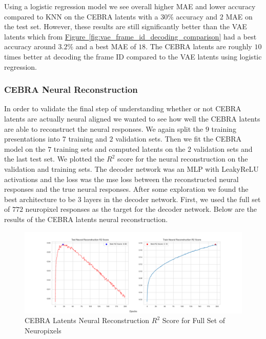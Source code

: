 \documentclass[12pt, letterpaper]{article}
\begin{document}
Using a logistic regression model we see overall higher MAE and lower accuracy compared to KNN on the CEBRA \cite{schneider2023} latents with a $30\%$ accuracy and $2$ MAE on the test set. However, these results are still significantly better than the VAE latents which from \hyperref[fig:vae_frame_id_decoding_comparison]{Figure~\ref{fig:vae_frame_id_decoding_comparison}} had a best accuracy around $3.2\%$ and a best MAE of $18$. The CEBRA \cite{schneider2023} latents are roughly $10$ times better at decoding the frame ID compared to the VAE latents using logistic regression.

\subsubsection{CEBRA Neural Reconstruction}
\label{subsubsec:cebra_neural_reconstruction}
In order to validate the final step of understanding whether or not CEBRA \cite{schneider2023} latents are actually neural aligned we wanted to see how well the CEBRA \cite{schneider2023} latents are able to reconstruct the neural responses. We again split the $9$ training presentations into $7$ training and $2$ validation sets. Then we fit the CEBRA model on the $7$ training sets and computed latents on the $2$ validation sets and the last test set. We plotted the $R^2$ score for the neural reconstruction on the validation and training sets. The decoder network was an MLP with LeakyReLU activations and the loss was the mse loss between the reconstructed neural responses and the true neural responses. After some exploration we found the best architecture to be $3$ layers in the decoder network. First, we used the full set of $772$ neuropixel responses as the target for the decoder network. Below are the results of the CEBRA \cite{schneider2023} latents neural reconstruction.

\begin{figure}[H]
    \centering
    \includegraphics[width=1.0\textwidth]{cebra_x_r2_772_200_epochs_3_layer.png}
    \caption{CEBRA Latents Neural Reconstruction $R^2$ Score for Full Set of Neuropixels}
    \label{fig:cebra_latents_neural_reconstruction_772}
\end{figure}
\end{document}

